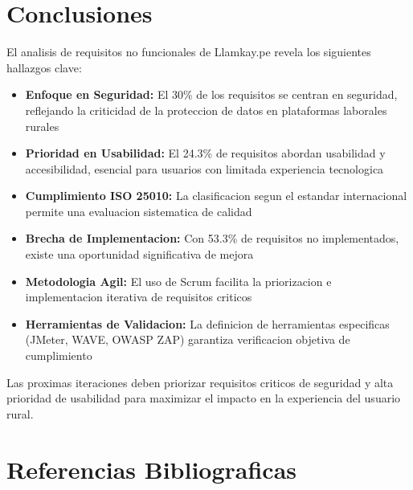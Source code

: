 \documentclass[12pt, a4paper]{article}
\begin{document}
\begin{itemize}
\section{Conclusiones}

\hspace{1.27cm}El analisis de requisitos no funcionales de Llamkay.pe revela los siguientes hallazgos clave:

\begin{itemize}
    \item \textbf{Enfoque en Seguridad:} El 30\% de los requisitos se centran en seguridad, reflejando la criticidad de la proteccion de datos en plataformas laborales rurales
    
    \item \textbf{Prioridad en Usabilidad:} El 24.3\% de requisitos abordan usabilidad y accesibilidad, esencial para usuarios con limitada experiencia tecnologica
    
    \item \textbf{Cumplimiento ISO 25010:} La clasificacion segun el estandar internacional permite una evaluacion sistematica de calidad
    
    \item \textbf{Brecha de Implementacion:} Con 53.3\% de requisitos no implementados, existe una oportunidad significativa de mejora
    
    \item \textbf{Metodologia Agil:} El uso de Scrum facilita la priorizacion e implementacion iterativa de requisitos criticos
    
    \item \textbf{Herramientas de Validacion:} La definicion de herramientas especificas (JMeter, WAVE, OWASP ZAP) garantiza verificacion objetiva de cumplimiento
\end{itemize}

\hspace{1.27cm}Las proximas iteraciones deben priorizar requisitos criticos de seguridad y alta prioridad de usabilidad para maximizar el impacto en la experiencia del usuario rural.

\section{Referencias Bibliograficas}


\end{itemize}
\end{document}
